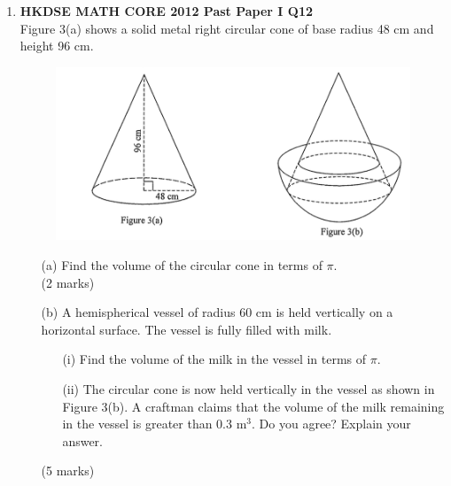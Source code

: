 \documentclass[12pt]{article}
\begin{document}
\begin{enumerate}
	\item \textbf{HKDSE MATH CORE 2012 Past Paper I Q12}\\
	Figure 3(a) shows a solid metal right circular cone of base radius 48 cm and height 96 cm.
 
	\begin{figure}[H]
		\centering
		\includegraphics[width = .3\linewidth]{2012Figure1.3}
	\end{figure}
	\begin{enumerate}
		\item[(a)] Find the volume of the circular cone in terms of $\pi$.\\(2 marks)
		\item[(b)] A hemispherical vessel of radius 60 cm is held vertically on a horizontal surface. The vessel is fully filled with milk.
		\begin{enumerate}
			\item[(i)] Find the volume of the milk in the vessel in terms of $\pi$.
			\item[(ii)] The circular cone is now held vertically in the vessel as shown in Figure 3(b). A craftman claims that the volume of the milk remaining in the vessel is greater than 0.3 m$^3$. Do you agree? Explain your answer. 
		\end{enumerate}
		(5 marks)
	\end{enumerate}


\end{enumerate}
\end{document}
